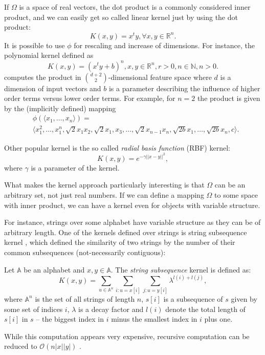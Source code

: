 If $\Omega$ is a space of real vectors, the dot product is a commonly considered inner product, and we can easily get so called linear kernel just by using the dot product:
\begin{equation}
K(x,y) = x^ty, \forall x,y \in \mathbb{R}^n.
\end{equation}
It is possible to use $\phi$ for rescaling and increase of dimensions. For instance, the polynomial kernel defined as 
\begin{equation}
K(x,y) = (x^ty+b)^n, x,y \in \mathbb{R}^n, r > 0, n \in \mathbb{N}, n > 0.
\end{equation}
computes the product in $\binom {d+2}2$-dimensional feature space where $d$ is a dimension of input vectors and $b$ is a parameter describing the influence of higher order terms versus lower order terms. For example, for $n=2$ the product is given by the (implicitly defined) mapping 
\begin{align*}
&\phi(\langle x_1,\dots,x_n\rangle)= \\
&\langle x_1^2,\dots, x_1^n,\sqrt{2}x_1x_2,\sqrt{2}x_1,x_3,\dots, \sqrt{2}x_{n-1}x_n,\sqrt{2b}x_1,\dots,\sqrt{2b}x_n,c\rangle.
\end{align*}

Other popular kernel is the so called \emph{radial basis function} (RBF) kernel:
\begin{equation*}
	K(x,y)=e^{-\gamma||x-y||^2},
\end{equation*}
where $\gamma$ is a parameter of the kernel.

What makes the kernel approach particularly interesting is that $\Omega$ can be an arbitrary set, not just real numbers. If we can define a mapping $\Omega$ to some space with inner product, we can  have a kernel even for objects with variable structure.

For instance, strings over some alphabet have variable structure as they can be of arbitrary length.
One of the kernels defined over strings is string subsequence kernel \cite{stringSubsequenceKernel}, which defined the similarity of two strings by the number of their common subsequences (not-necessarily contiguous):

\begin{definition}
	Let $\mathbb{A}$ be an alphabet and $x,y \in \mathbb{A}$. The \emph{string subsequence} kernel is defined as:
	\begin{equation*}
	K(x,y)=\sum_{u \in \mathbb{A}^n}\sum_{i: u = x[i]}\sum_{j: u = y[i]} \lambda ^{l(i)+l(j)},
	\end{equation*}
	where $\mathbb{A}^n$ is the set of all strings of length $n$, $s[i]$ is a subsequence of $s$ given by some set of indices $i$, $\lambda$ is a decay factor and $l(i)$ denote the total length of $s[i]$ in $s$ -- the biggest index in $i$ minus the smallest index in $i$ plus one.
\end{definition}
While this computation appears very expensive, recursive computation can be reduced to $\mathcal{O}(n|x||y|)$ \cite{stringSubsequenceKernel}. 

